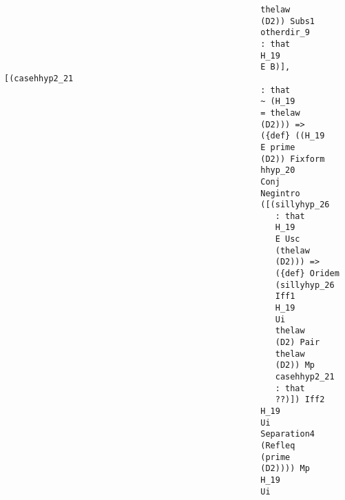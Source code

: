 \documentclass[12pt]{article}
\begin{document}
\begin{verbatim}
                                                    thelaw 
                                                    (D2)) Subs1 
                                                    otherdir_9 
                                                    : that 
                                                    H_19 
                                                    E B)], [(casehhyp2_21 
                                                    : that 
                                                    ~ (H_19 
                                                    = thelaw 
                                                    (D2))) => 
                                                    ({def} ((H_19 
                                                    E prime 
                                                    (D2)) Fixform 
                                                    hhyp_20 
                                                    Conj 
                                                    Negintro 
                                                    ([(sillyhyp_26 
                                                       : that 
                                                       H_19 
                                                       E Usc 
                                                       (thelaw 
                                                       (D2))) => 
                                                       ({def} Oridem 
                                                       (sillyhyp_26 
                                                       Iff1 
                                                       H_19 
                                                       Ui 
                                                       thelaw 
                                                       (D2) Pair 
                                                       thelaw 
                                                       (D2)) Mp 
                                                       casehhyp2_21 
                                                       : that 
                                                       ??)]) Iff2 
                                                    H_19 
                                                    Ui 
                                                    Separation4 
                                                    (Refleq 
                                                    (prime 
                                                    (D2)))) Mp 
                                                    H_19 
                                                    Ui 

\end{verbatim}
\end{document}
